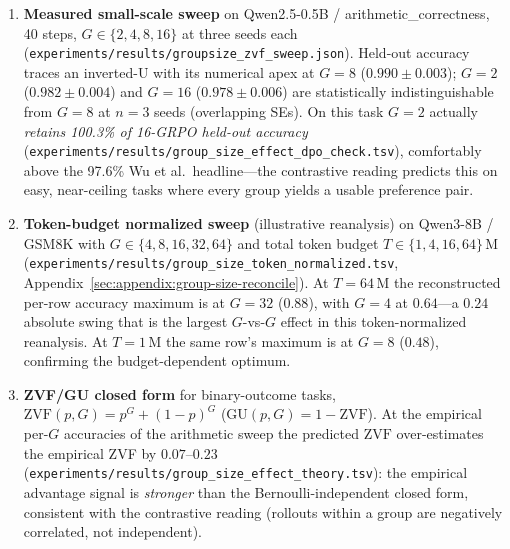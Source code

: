 \documentclass{article}
\begin{document}
\begin{enumerate}
  \item \textbf{Measured small-scale sweep} on Qwen2.5-0.5B /
        arithmetic\_correctness, 40 steps, $G \in \{2, 4, 8, 16\}$ at
        three seeds each
        (\texttt{experiments/results/groupsize\_zvf\_sweep.json}).
        Held-out accuracy traces an inverted-U with its numerical apex
        at $G{=}8$ ($0.990{\pm}0.003$); $G{=}2$ ($0.982{\pm}0.004$) and
        $G{=}16$ ($0.978{\pm}0.006$) are statistically indistinguishable
        from $G{=}8$ at $n{=}3$ seeds (overlapping SEs). On this task
        $G{=}2$ actually \emph{retains 100.3\% of 16-GRPO held-out accuracy}
        (\texttt{experiments/results/group\_size\_effect\_dpo\_check.tsv}),
        comfortably above the 97.6\% Wu et al.\ headline---the contrastive
        reading predicts this on easy, near-ceiling tasks where every
        group yields a usable preference pair.
  \item \textbf{Token-budget normalized sweep} (illustrative reanalysis)
        on Qwen3-8B / GSM8K with $G \in \{4, 8, 16, 32, 64\}$ and total
        token budget $T \in \{1, 4, 16, 64\}\,$M
        (\texttt{experiments/results/group\_size\_token\_normalized.tsv},
        Appendix~\ref{sec:appendix:group-size-reconcile}). At
        $T{=}64\,$M the reconstructed per-row accuracy maximum is at $G{=}32$
        ($0.88$), with $G{=}4$ at $0.64$---a $0.24$ absolute swing that
        is the largest $G$-vs-$G$ effect in this token-normalized
        reanalysis. At $T{=}1\,$M the same row's maximum is at $G{=}8$
        ($0.48$), confirming the budget-dependent optimum.
  \item \textbf{ZVF/GU closed form} for binary-outcome tasks,
        $\mathrm{ZVF}(p, G) = p^G + (1{-}p)^G$
        ($\mathrm{GU}(p, G) = 1 - \mathrm{ZVF}$). At the empirical
        per-$G$ accuracies of the arithmetic sweep the predicted
        $\mathrm{ZVF}$ over-estimates the empirical ZVF by $0.07$--$0.23$
        (\texttt{experiments/results/group\_size\_effect\_theory.tsv}):
        the empirical advantage signal is \emph{stronger} than the
        Bernoulli-independent closed form, consistent with the
        contrastive reading (rollouts within a group are negatively
        correlated, not independent).
\end{enumerate}
\end{document}
